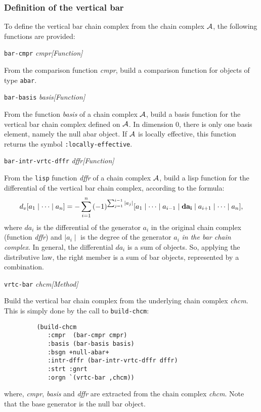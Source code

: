 \subsubsection {Definition of the vertical bar}

To define the vertical bar chain complex from the chain complex ${\cal A}$, the
following functions are provided:
\vskip 0.45cm
{\parindent=0mm
{\leftskip=5mm 
{\tt bar-cmpr} {\em cmpr}\hfill {\em [Function]} \par}
{\leftskip=15mm 
From the comparison function {\em cmpr}, build a comparison function for objects
of  type {\tt abar}. \par}
{\leftskip=5mm 
{\tt bar-basis} {\em basis}\hfill {\em [Function]} \par}
{\leftskip=15mm 
From the function {\em basis} of a  chain complex ${\cal A}$, build a basis
function for the vertical bar chain complex defined on ${\cal A}$. In dimension $0$, there
is only one basis element, namely the null abar object. If ${\cal A}$ is locally effective,
this function returns the symbol {\tt :locally-effective}. \par}
{\leftskip=5mm 
{\tt bar-intr-vrtc-dffr} {\em dffr}\hfill {\em [Function]} \par}
{\leftskip=15mm 
From the {\tt lisp} function {\em dffr} of a chain complex  ${\cal A}$, build a 
lisp function for the differential of the vertical bar chain complex, according to the formula:
$$d_v [a_1 \mid \cdots \mid a_n]=
-\sum_{i=1}^n{(-1)^{\sum_{j=1}^{i-1}{\mid a_j \mid}}}
 {[a_1 \mid \cdots \mid a_{i-1} \mid {\bf da_i} \mid a_{i+1} \mid \cdots \mid a_n]},$$
where $da_i$ is the differential of the generator $a_i$ in the original chain complex (function {\em dffr})
and $\mid a_i \mid$ is the degree of the generator $a_i$ {\em in the bar chain complex}.
In general, the differential $da_i$ is a sum of  objects.
So, applying the distributive law, the right member is a sum of bar objects, represented by a combination. \par}
{\leftskip=5mm 
{\tt vrtc-bar} {\em chcm}\hfill {\em [Method]} \par}
{\leftskip=15mm 
Build the vertical bar chain complex from the underlying chain complex {\em chcm}. This is simply done by the 
call to {\tt build-chcm}:
{\footnotesize\begin{verbatim}
         (build-chcm
            :cmpr  (bar-cmpr cmpr)
            :basis (bar-basis basis)
            :bsgn +null-abar+
            :intr-dffr (bar-intr-vrtc-dffr dffr)
            :strt :gnrt
            :orgn `(vrtc-bar ,chcm))
\end{verbatim}}
where, {\em cmpr}, {\em basis} and {\em dffr} are extracted from the chain complex {\em chcm}. Note that
the base generator is the null bar object. \par}
}

